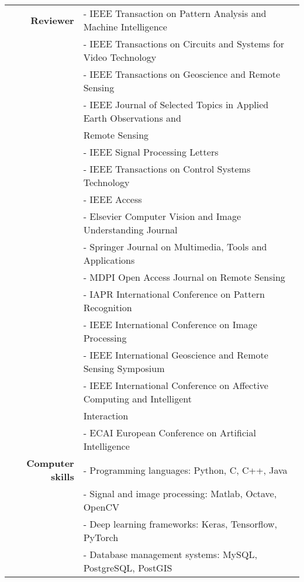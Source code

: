 \documentclass[a4paper,10pt]{article}
\begin{document}
\begin{longtable}{r p{11cm}}
\textbf{Reviewer}
& - IEEE Transaction on Pattern Analysis and Machine Intelligence\\
& - IEEE Transactions on Circuits and Systems for Video Technology \\
& - IEEE Transactions on Geoscience and Remote Sensing \\
& - IEEE Journal of Selected Topics in Applied Earth Observations and\\
& \hspace{0.05in} Remote Sensing\\
& - IEEE Signal Processing Letters \\
& - IEEE Transactions on Control Systems Technology \\
& - IEEE Access \\
& - Elsevier Computer Vision and Image Understanding Journal\\
& - Springer Journal on Multimedia, Tools and Applications \\
& - MDPI Open Access Journal on Remote Sensing \\
& - IAPR International Conference on Pattern Recognition \\
& - IEEE International Conference on Image Processing \\
& - IEEE International Geoscience and Remote Sensing Symposium \\
& - IEEE International Conference on Affective Computing and Intelligent \\
& \hspace{0.05in} Interaction \\
& - ECAI European Conference on Artificial Intelligence

\vspace{0.05in}\\

\textbf{Computer skills}
& - Programming languages: Python, C, C++, Java \\
& - Signal and image processing: Matlab, Octave, OpenCV \\
& - Deep learning frameworks: Keras, Tensorflow, PyTorch \\
& - Database management systems: MySQL, PostgreSQL, PostGIS 
\end{longtable}

\end{document}
